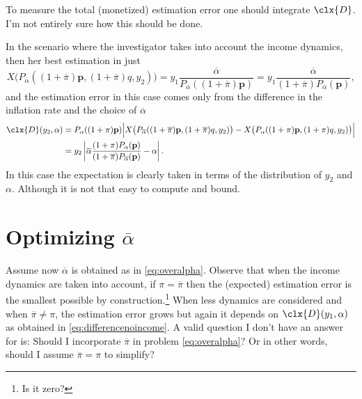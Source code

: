 \documentclass[english, a4paper,12pt]{article}
\begin{document}
To measure the total (monetized) estimation error one should integrate $\clx{D}$. I'm not entirely sure how this should be done.

In the scenario where the investigator takes into account the income dynamics, then her best estimation in just
	$$X\big(P_{\overline{\alpha}}((1+\overline{\pi})\mathbf{p}, (1+\overline{\pi})q, y_{2})\big) 
		= y_{1}\frac{\overline{\alpha}}{P_{\overline{\alpha}}((1+\overline{\pi})\mathbf{p})}
		= y_{1}\frac{\overline{\alpha}}{(1+\overline{\pi})P_{\overline{\alpha}}(\mathbf{p})},
	$$
and the estimation error in this case comes only from the difference in the inflation rate and the choice of $\overline{\alpha}$
	\begin{align*}
		\clx{D}(y_{2}, \alpha) 
			&=	P_{\alpha}((1+\pi)\mathbf{p}) \Big| X\big(P_{\overline{\alpha}}((1+\overline{\pi})\mathbf{p}, (1+\overline{\pi})q, y_{2})\big) 
					- X\big(P_{\alpha}((1+\pi)\mathbf{p}, (1+\pi)q, y_{2})\big) \Big|	\\
			&=	y_{2}\left| \overline{\alpha}\frac{(1+\pi)P_{\alpha}(\mathbf{p})}{(1+\overline{\pi})P_{\overline{\alpha}}(\mathbf{p})} 
							-\alpha \right|.
	\end{align*}
In this case the expectation is clearly taken in terms of the distribution of $y_{2}$ and $\alpha$. Although it is not that easy to compute and bound.

\section{Optimizing $\overline{\alpha}$}
Assume now $\overline{\alpha}$ is obtained as in \eqref{eq:overalpha}. Observe that when the income dynamics are taken into account, if $\pi = \overline{\pi}$ then the (expected) estimation error is the smallest possible by construction.\footnote{Is it zero?} When less dynamics are considered and when $\overline{\pi} \neq \pi$, the estimation error grows but again it depends on $\clx{D}(y_{1}, \alpha)$ as obtained in \eqref{eq:differencenoincome}. A valid question I don't have an answer for is: Should I incorporate $\overline{\pi}$ in problem \eqref{eq:overalpha}? Or in other words, should I assume $\overline{\pi} = \pi$ to simplify?




\end{document}
